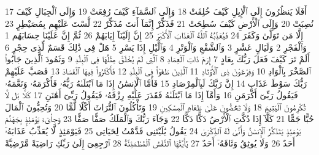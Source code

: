 {\tiny\colorbox{cl_aya}{17}} أَفَلَا يَنظُرُونَ إِلَى ٱلْإِبِلِ كَيْفَ خُلِقَتْ
{\tiny\colorbox{cl_aya}{18}} وَإِلَى ٱلسَّمَآءِ كَيْفَ رُفِعَتْ
{\tiny\colorbox{cl_aya}{19}} وَإِلَى ٱلْجِبَالِ كَيْفَ نُصِبَتْ
{\tiny\colorbox{cl_aya}{20}} وَإِلَى ٱلْأَرْضِ كَيْفَ سُطِحَتْ
{\tiny\colorbox{cl_aya}{21}} فَذَكِّرْ إِنَّمَآ أَنتَ مُذَكِّرٌ
{\tiny\colorbox{cl_aya}{22}} لَّسْتَ عَلَيْهِم بِمُصَيْطِرٍ
{\tiny\colorbox{cl_aya}{23}} إِلَّا مَن تَوَلَّىٰ وَكَفَرَ
{\tiny\colorbox{cl_aya}{24}} فَيُعَذِّبُهُ ٱللَّهُ ٱلْعَذَابَ ٱلْأَكْبَرَ
{\tiny\colorbox{cl_aya}{25}} إِنَّ إِلَيْنَآ إِيَابَهُمْ
{\tiny\colorbox{cl_aya}{26}} ثُمَّ إِنَّ عَلَيْنَا حِسَابَهُم
{\tiny\colorbox{cl_aya}{1}} وَٱلْفَجْرِ
{\tiny\colorbox{cl_aya}{2}} وَلَيَالٍ عَشْرٍ
{\tiny\colorbox{cl_aya}{3}} وَٱلشَّفْعِ وَٱلْوَتْرِ
{\tiny\colorbox{cl_aya}{4}} وَٱلَّيْلِ إِذَا يَسْرِ
{\tiny\colorbox{cl_aya}{5}} هَلْ فِى ذَٰلِكَ قَسَمٌ لِّذِى حِجْرٍ
{\tiny\colorbox{cl_aya}{6}} أَلَمْ تَرَ كَيْفَ فَعَلَ رَبُّكَ بِعَادٍ
{\tiny\colorbox{cl_aya}{7}} إِرَمَ ذَاتِ ٱلْعِمَادِ
{\tiny\colorbox{cl_aya}{8}} ٱلَّتِى لَمْ يُخْلَقْ مِثْلُهَا فِى ٱلْبِلَٰدِ
{\tiny\colorbox{cl_aya}{9}} وَثَمُودَ ٱلَّذِينَ جَابُوا۟ ٱلصَّخْرَ بِٱلْوَادِ
{\tiny\colorbox{cl_aya}{10}} وَفِرْعَوْنَ ذِى ٱلْأَوْتَادِ
{\tiny\colorbox{cl_aya}{11}} ٱلَّذِينَ طَغَوْا۟ فِى ٱلْبِلَٰدِ
{\tiny\colorbox{cl_aya}{12}} فَأَكْثَرُوا۟ فِيهَا ٱلْفَسَادَ
{\tiny\colorbox{cl_aya}{13}} فَصَبَّ عَلَيْهِمْ رَبُّكَ سَوْطَ عَذَابٍ
{\tiny\colorbox{cl_aya}{14}} إِنَّ رَبَّكَ لَبِٱلْمِرْصَادِ
{\tiny\colorbox{cl_aya}{15}} فَأَمَّا ٱلْإِنسَٰنُ إِذَا مَا ٱبْتَلَىٰهُ رَبُّهُۥ فَأَكْرَمَهُۥ وَنَعَّمَهُۥ فَيَقُولُ رَبِّىٓ أَكْرَمَنِ
{\tiny\colorbox{cl_aya}{16}} وَأَمَّآ إِذَا مَا ٱبْتَلَىٰهُ فَقَدَرَ عَلَيْهِ رِزْقَهُۥ فَيَقُولُ رَبِّىٓ أَهَٰنَنِ
{\tiny\colorbox{cl_aya}{17}} كَلَّا بَل لَّا تُكْرِمُونَ ٱلْيَتِيمَ
{\tiny\colorbox{cl_aya}{18}} وَلَا تَحَٰٓضُّونَ عَلَىٰ طَعَامِ ٱلْمِسْكِينِ
{\tiny\colorbox{cl_aya}{19}} وَتَأْكُلُونَ ٱلتُّرَاثَ أَكْلًا لَّمًّا
{\tiny\colorbox{cl_aya}{20}} وَتُحِبُّونَ ٱلْمَالَ حُبًّا جَمًّا
{\tiny\colorbox{cl_aya}{21}} كَلَّآ إِذَا دُكَّتِ ٱلْأَرْضُ دَكًّا دَكًّا
{\tiny\colorbox{cl_aya}{22}} وَجَآءَ رَبُّكَ وَٱلْمَلَكُ صَفًّا صَفًّا
{\tiny\colorbox{cl_aya}{23}} وَجِا۟ىٓءَ يَوْمَئِذٍۭ بِجَهَنَّمَ يَوْمَئِذٍ يَتَذَكَّرُ ٱلْإِنسَٰنُ وَأَنَّىٰ لَهُ ٱلذِّكْرَىٰ
{\tiny\colorbox{cl_aya}{24}} يَقُولُ يَٰلَيْتَنِى قَدَّمْتُ لِحَيَاتِى
{\tiny\colorbox{cl_aya}{25}} فَيَوْمَئِذٍ لَّا يُعَذِّبُ عَذَابَهُۥٓ أَحَدٌ
{\tiny\colorbox{cl_aya}{26}} وَلَا يُوثِقُ وَثَاقَهُۥٓ أَحَدٌ
{\tiny\colorbox{cl_aya}{27}} يَٰٓأَيَّتُهَا ٱلنَّفْسُ ٱلْمُطْمَئِنَّةُ
{\tiny\colorbox{cl_aya}{28}} ٱرْجِعِىٓ إِلَىٰ رَبِّكِ رَاضِيَةً مَّرْضِيَّةً
